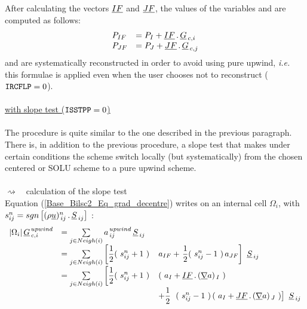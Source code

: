 After calculating the vectors $\underline{IF}$ and $\underline{JF}$, the values of the variables  and  are computed as follows:
\begin{equation}
\begin{array}{ll}
P_{IF} &= P_I + \underline{IF}\,.\,\underline{G}_{\,c,i}\\
P_{JF} &= P_J + \underline{JF}\,.\,\underline{G}_{\,c,j}\\
\end{array}
\end{equation}
  and  are systematically reconstructed in order to avoid
using pure upwind, {\it i.e.} this formulae is applied even when the user
chooses not to reconstruct ($\text{\texttt{IRCFLP}} = 0$).\\\\
\hspace*{2cm}{\tiny$\blacksquare$} \underline{ with slope test ($\text{\texttt{ISSTPP}}
= 0$)}\\\\
The procedure is quite similar to the one described in the previous paragraph.
There is, in addition to the previous procedure, a slope test that makes under
certain conditions the scheme switch locally (but systematically) from the chosen
 centered or SOLU scheme to a pure upwind scheme. \\\\
\hspace*{2.5cm}$\rightsquigarrow$\ \ calculation of the slope test\\
Equation (\ref{Base_Bilsc2_Eq_grad_decentre}) writes on an internal cell
$\Omega_i$, with
$ s^n_{ij} = sgn \left[(\rho\underline{u})_{\,ij}^n\,.\,\underline{S}_{\,ij}\right]$ :\\
\begin{equation}\notag
\begin{array}{lll}
|\Omega_i|\,\vect{G}^{\,upwind}_{\,c,i}&=
\sum\limits_{j\in \Neigh{i}}a^{\,upwind}_{\,ij}\,{\vect S_{\,ij}} \\
&=\sum\limits_{j\in
\Neigh{i}}\left[\displaystyle\frac{1}{2}(\ s^n_{ij} + 1\ )\right.&a_{IF} +
\left.\displaystyle\frac{1}{2}(\ s^n_{ij} - 1\ )\,a_{JF}\right]\ \vect{S}_{\,ij}\\
&=\sum\limits_{j\in
\Neigh{i}}\left[\displaystyle\frac{1}{2}(\ s^n_{ij} + 1\ )\right.&(\ a_I + \vect {IF}\,.\,(\grad a)_{\,I}\ ) \\
& &
+\displaystyle\frac{1}{2}\ \left.(\ s^n_{ij} - 1\ )\,(\ a_I + \vect{JF}\,.\,(\grad a)_{\,J}\ )\right]\ \vect{S}_{\,ij}
\end{array}
\end{equation}\\
